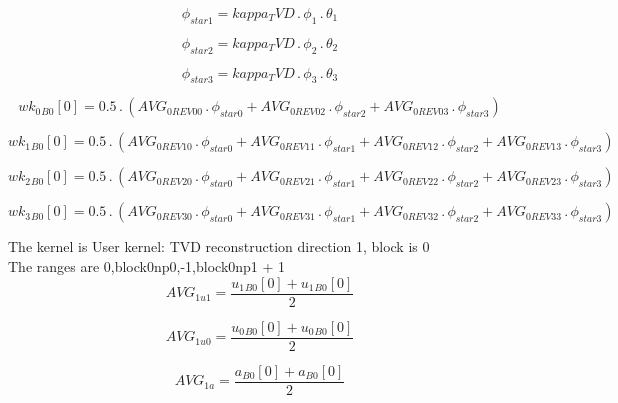 \documentclass{article}
\begin{document}
\begin{dmath}\phi_{star 1} = kappa_TVD \,.\, \phi_{1} \,.\, \theta_{1}\end{dmath}

\begin{dmath}\phi_{star 2} = kappa_TVD \,.\, \phi_{2} \,.\, \theta_{2}\end{dmath}

\begin{dmath}\phi_{star 3} = kappa_TVD \,.\, \phi_{3} \,.\, \theta_{3}\end{dmath}

\begin{dmath}{wk_{0}{_{B0}}}[{0}] = 0.5 \,.\, \left(AVG_{0 REV 00} \,.\, \phi_{star 0} + AVG_{0 REV 02} \,.\, \phi_{star 2} + AVG_{0 REV 03} \,.\, \phi_{star 3}\right)\end{dmath}

\begin{dmath}{wk_{1}{_{B0}}}[{0}] = 0.5 \,.\, \left(AVG_{0 REV 10} \,.\, \phi_{star 0} + AVG_{0 REV 11} \,.\, \phi_{star 1} + AVG_{0 REV 12} \,.\, \phi_{star 2} + AVG_{0 REV 13} \,.\, \phi_{star 3}\right)\end{dmath}

\begin{dmath}{wk_{2}{_{B0}}}[{0}] = 0.5 \,.\, \left(AVG_{0 REV 20} \,.\, \phi_{star 0} + AVG_{0 REV 21} \,.\, \phi_{star 1} + AVG_{0 REV 22} \,.\, \phi_{star 2} + AVG_{0 REV 23} \,.\, \phi_{star 3}\right)\end{dmath}

\begin{dmath}{wk_{3}{_{B0}}}[{0}] = 0.5 \,.\, \left(AVG_{0 REV 30} \,.\, \phi_{star 0} + AVG_{0 REV 31} \,.\, \phi_{star 1} + AVG_{0 REV 32} \,.\, \phi_{star 2} + AVG_{0 REV 33} \,.\, \phi_{star 3}\right)\end{dmath}

\noindent The kernel is User kernel: TVD reconstruction direction 1, block is 0\\\noindent The ranges are 0,block0np0,-1,block0np1 + 1\\\begin{dmath}AVG_{1 u1} = \frac{{u_{1}{_{B0}}}[{0}] + {u_{1}{_{B0}}}[{0}]}{2}\end{dmath}

\begin{dmath}AVG_{1 u0} = \frac{{u_{0}{_{B0}}}[{0}] + {u_{0}{_{B0}}}[{0}]}{2}\end{dmath}

\begin{dmath}AVG_{1 a} = \frac{{a{_{B0}}}[{0}] + {a{_{B0}}}[{0}]}{2}\end{dmath}
\end{document}
